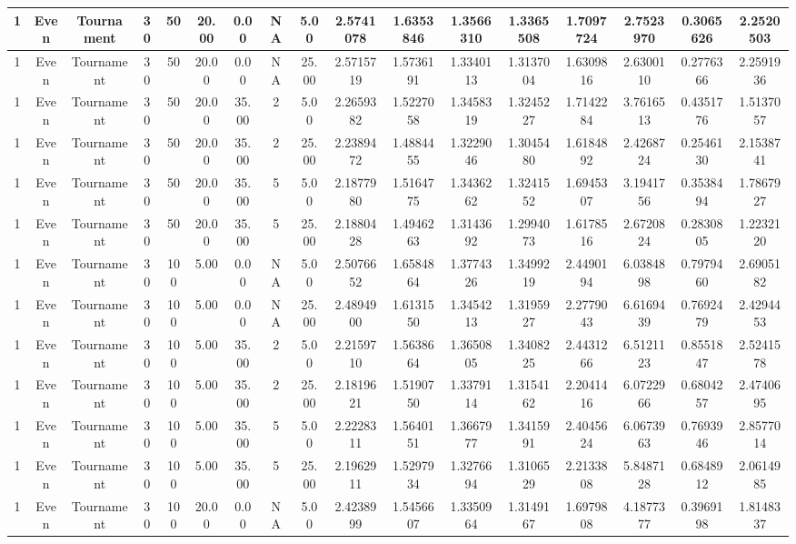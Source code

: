\begin{longtable}{ | c | c | c | c | c | c | c | c | c | c | c | c | c | c | c | c | c | }
	\hline
	1	&	Even	&	Tournament	&	30	&	50	&	20.00	&	0.00	&	NA	&	5.00	&	2.5741078	&	1.6353846	&	1.3566310	&	1.3365508	&	1.7097724	&	2.7523970	&	0.3065626	&	2.2520503 \\
	\hline
	1	&	Even	&	Tournament	&	30	&	50	&	20.00	&	0.00	&	NA	&	25.00	&	2.5715719	&	1.5736191	&	1.3340113	&	1.3137004	&	1.6309816	&	2.6300110	&	0.2776366	&	2.2591936 \\
	\hline
	1	&	Even	&	Tournament	&	30	&	50	&	20.00	&	35.00	&	2	&	5.00	&	2.2659382	&	1.5227058	&	1.3458319	&	1.3245227	&	1.7142284	&	3.7616513	&	0.4351776	&	1.5137057 \\
	\hline
	1	&	Even	&	Tournament	&	30	&	50	&	20.00	&	35.00	&	2	&	25.00	&	2.2389472	&	1.4884455	&	1.3229046	&	1.3045480	&	1.6184892	&	2.4268724	&	0.2546130	&	2.1538741 \\
	\hline
	1	&	Even	&	Tournament	&	30	&	50	&	20.00	&	35.00	&	5	&	5.00	&	2.1877980	&	1.5164775	&	1.3436262	&	1.3241552	&	1.6945307	&	3.1941756	&	0.3538494	&	1.7867927 \\
	\hline
	1	&	Even	&	Tournament	&	30	&	50	&	20.00	&	35.00	&	5	&	25.00	&	2.1880428	&	1.4946263	&	1.3143692	&	1.2994073	&	1.6178516	&	2.6720824	&	0.2830805	&	1.2232120 \\
	\hline
	1	&	Even	&	Tournament	&	30	&	100	&	5.00	&	0.00	&	NA	&	5.00	&	2.5076652	&	1.6584864	&	1.3774326	&	1.3499219	&	2.4490194	&	6.0384898	&	0.7979460	&	2.6905182 \\
	\hline
	1	&	Even	&	Tournament	&	30	&	100	&	5.00	&	0.00	&	NA	&	25.00	&	2.4894900	&	1.6131550	&	1.3454213	&	1.3195927	&	2.2779043	&	6.6169439	&	0.7692479	&	2.4294453 \\
	\hline
	1	&	Even	&	Tournament	&	30	&	100	&	5.00	&	35.00	&	2	&	5.00	&	2.2159710	&	1.5638664	&	1.3650805	&	1.3408225	&	2.4431266	&	6.5121123	&	0.8551847	&	2.5241578 \\
	\hline
	1	&	Even	&	Tournament	&	30	&	100	&	5.00	&	35.00	&	2	&	25.00	&	2.1819621	&	1.5190750	&	1.3379114	&	1.3154162	&	2.2041416	&	6.0722966	&	0.6804257	&	2.4740695 \\
	\hline
	1	&	Even	&	Tournament	&	30	&	100	&	5.00	&	35.00	&	5	&	5.00	&	2.2228311	&	1.5640151	&	1.3667977	&	1.3415991	&	2.4045624	&	6.0673963	&	0.7693946	&	2.8577014 \\
	\hline
	1	&	Even	&	Tournament	&	30	&	100	&	5.00	&	35.00	&	5	&	25.00	&	2.1962911	&	1.5297934	&	1.3276694	&	1.3106529	&	2.2133808	&	5.8487128	&	0.6848912	&	2.0614985 \\
	\hline
	1	&	Even	&	Tournament	&	30	&	100	&	20.00	&	0.00	&	NA	&	5.00	&	2.4238999	&	1.5456607	&	1.3350964	&	1.3149167	&	1.6979808	&	4.1877377	&	0.3969198	&	1.8148337 \\

\end{longtable}
